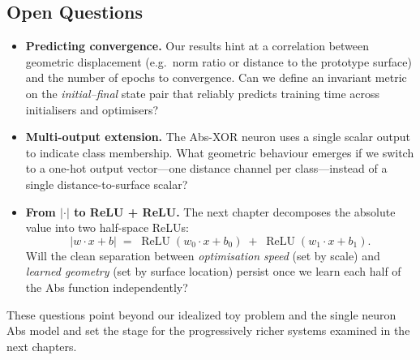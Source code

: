 \subsection*{Open Questions}

\begin{itemize}
    \item \textbf{Predicting convergence.}  
          Our results hint at a correlation between geometric displacement
          (e.g.\ norm ratio or distance to the prototype surface) and the
          number of epochs to convergence.  Can we define an invariant metric
          on the \emph{initial–final} state pair that reliably predicts
          training time across initialisers and optimisers?

    \item \textbf{Multi-output extension.}  
          The Abs-XOR neuron uses a single scalar output to indicate class
          membership.  What geometric behaviour emerges if we switch to a
          one-hot output vector—one distance channel per class—instead of a
          single distance-to-surface scalar?

    \item \textbf{From $\lvert\cdot\rvert$ to ReLU + ReLU.}  
          The next chapter decomposes the absolute value into two half-space
          ReLUs:  
          \[
              \lvert w\!\cdot\!x + b\rvert
              \;=\;
              \operatorname{ReLU}(w_0\!\cdot\!x + b_0)
              \;+\;
              \operatorname{ReLU}(w_1\!\cdot\!x + b_1).
          \]
          Will the clean separation between \emph{optimisation speed} (set by
          scale) and \emph{learned geometry} (set by surface location) persist
          once we learn each half of the Abs function independently?
\end{itemize}

These questions point beyond our idealized toy problem and the single 
neuron Abs model and set the stage for the progressively richer systems 
examined in the next chapters.
